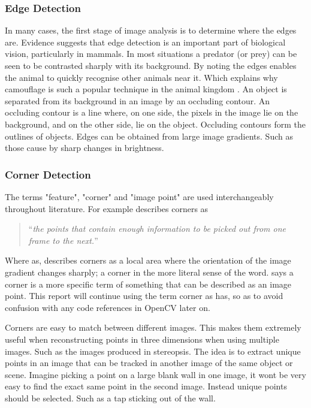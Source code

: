 \documentclass[11pt,oneside]{report}
\begin{document}
					\subsubsection{Edge Detection}
					In many cases, the first stage of image analysis is to determine where the edges are.
					Evidence suggests that edge detection is an important part of biological vision, particularly in mammals.
					In most situations a predator (or prey) can be seen to be contrasted sharply with its background.
					By noting the edges enables the animal to quickly recognise other animals near it.
					Which explains why camouflage is such a popular technique in the animal kingdom \cite{book:aiIlluminated}.
					An object is separated from its background in an image by an occluding contour.
					An occluding contour is a line where, on one side, the pixels in the image lie on the background, and on the other side, lie on the object.
					Occluding contours form the outlines of objects.
					Edges can be obtained from large image gradients.
					Such as those cause by sharp changes in brightness.
					\subsubsection{Corner Detection}
					The terms "feature", "corner" and "image point" are used interchangeably throughout literature.
					For example  describes corners as
					\begin{quote}
						``\textit{the points that contain enough information to be picked out from one frame to the next.}''
					\end{quote}
					Where as,  describes corners as a local area where the orientation of the image gradient changes sharply; a corner in the more literal sense of the word.
					 says a corner is a more specific term of something that can be described as an image point.
					This report will continue using the term corner as  has, so as to avoid confusion with any code references in OpenCV later on.
					
					Corners are easy to match between different images.
					This makes them extremely useful when reconstructing points in three dimensions when using multiple images.
					Such as the images produced in stereopsis.
					The idea is to extract unique points in an image that can be tracked in another image of the same object or scene.
					Imagine picking a point on a large blank wall in one image, it wont be very easy to find the exact same point in the second image.
					Instead unique points should be selected.
					Such as a tap sticking out of the wall.
					
\end{document}
